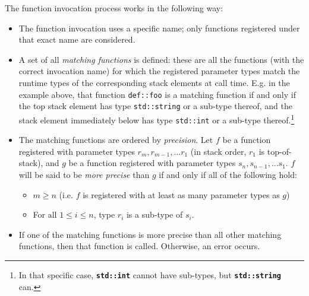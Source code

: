 The function invocation process works in the following way:
\begin{itemize}

    \item The function invocation uses a specific name; only functions
    registered under that exact name are considered.

    \item A set of all \emph{matching functions} is defined: these are
    all the functions (with the correct invocation name) for which the
    registered parameter types match the runtime types of the
    corresponding stack elements at call time. E.g. in the example
    above, that function \verb|def::foo| is a matching function if and
    only if the top stack element has type \verb|std::string| or a
    sub-type thereof, and the stack element immediately below has type
    \verb|std::int| or a sub-type thereof.\footnote{In that specific
    case, \texttt{\textbf{std::int}} cannot have sub-types, but
    \texttt{\textbf{std::string}} can.}

    \item The matching functions are ordered by \emph{precision}. Let
    $f$ be a function registered with parameter types $r_m, r_{m-1},...
    r_1$ (in stack order, $r_1$ is top-of-stack), and $g$ be a function
    registered with parameter types $s_n, s_{n-1},... s_1$. $f$ will be
    said to be \emph{more precise} than $g$ if and only if all of the
    following hold:
    \begin{itemize}

        \item $m \ge n$ (i.e. $f$ is registered with at least as many
        parameter types as $g$)

        \item For all $1\le i\le n$, type $r_i$ is a sub-type of $s_i$.

    \end{itemize}

    \item If one of the matching functions is more precise than all other
    matching functions, then that function is called. Otherwise, an
    error occurs.

\end{itemize}

